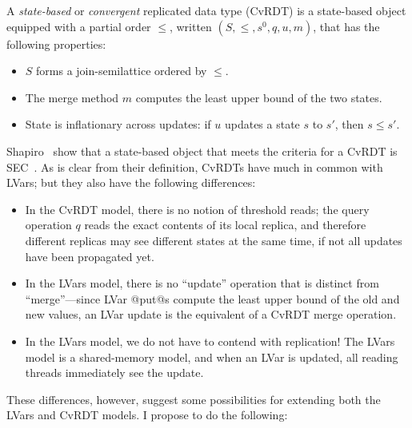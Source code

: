 \documentclass{article}
\begin{document}
A \emph{state-based} or \emph{convergent} replicated data type (CvRDT)
is a state-based object equipped with a partial order $\leq$, written
$(S, \leq, s^0, q, u, m)$, that has the following properties:
\begin{itemize}
\item $S$ forms a join-semilattice ordered by $\leq$.
\item The merge method $m$ computes the least upper bound of the two
  states.
\item State is inflationary across updates: if $u$ updates a state $s$
  to $s'$, then $s \leq s'$.
\end{itemize}
Shapiro \etal~show that a state-based object that meets the criteria
for a CvRDT is SEC~\cite{crdts}.  As is clear from their definition,
CvRDTs have much in common with LVars; but they also have the
following differences:
\begin{itemize}
\item In the CvRDT model, there is no notion of threshold reads; the
  query operation $q$ reads the exact contents of its local replica,
  and therefore different replicas may see different states at the
  same time, if not all updates have been propagated yet.
\item In the LVars model, there is no ``update'' operation that is
  distinct from ``merge''---since LVar @put@s compute the least upper
  bound of the old and new values, an LVar update is the equivalent of
  a CvRDT merge operation.
\item In the LVars model, we do not have to contend with replication!
  The LVars model is a shared-memory model, and when an LVar is
  updated, all reading threads immediately see the update.
\end{itemize}
These differences, however, suggest some possibilities for extending
both the LVars and CvRDT models.  I propose to do the following:
\end{document}
